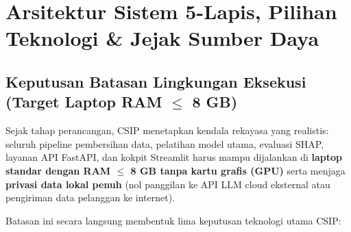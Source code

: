 \documentclass[11pt,a4paper,oneside]{book}
\begin{document}
\chapter{Arsitektur Sistem 5-Lapis, Pilihan Teknologi \& Jejak Sumber Daya}

\section{Keputusan Batasan Lingkungan Eksekusi (Target Laptop RAM $\le$ 8 GB)}

Sejak tahap perancangan, CSIP menetapkan kendala rekayasa yang realistis: seluruh pipeline pembersihan data, pelatihan model utama, evaluasi SHAP, layanan API FastAPI, dan kokpit Streamlit harus mampu dijalankan di \textbf{laptop standar dengan RAM $\le$ 8 GB tanpa kartu grafis (GPU)} serta menjaga \textbf{privasi data lokal penuh} (nol panggilan ke API LLM cloud eksternal atau pengiriman data pelanggan ke internet).

Batasan ini secara langsung membentuk lima keputusan teknologi utama CSIP:
\end{document}

